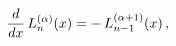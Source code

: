 \[\frac{d}{dx}\mathop{L^{(\alpha)}_{n}\/}\nolimits\!\left(x\right)=-\mathop{L^{(%
\alpha+1)}_{n-1}\/}\nolimits\!\left(x\right),\]